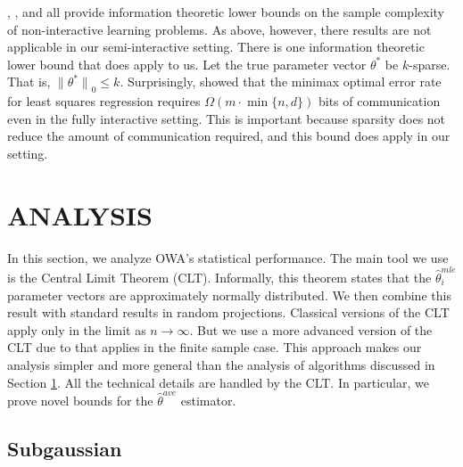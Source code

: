 \documentclass[twoside]{article}
\newcommand{\w}{\theta}
\newcommand{\wave}{\hat\w^{ave}}
\newcommand{\wmle}{\hat\w^{mle}}
\newcommand{\wstar}{{\w^{*}}}
\newcommand{\lzero}[1]{{\lVert {#1} \rVert}_0}
\begin{document}
\cite{shamir2014fundamental}, \cite{zhang2013information}, and \cite{garg2014communication} all provide information theoretic lower bounds on the sample complexity of non-interactive learning problems.
As above, however, there results are not applicable in our semi-interactive setting.
There is one information theoretic lower bound that does apply to us.
Let the true parameter vector $\wstar$ be $k$-sparse.
That is, $\lzero{\wstar} \le k$.
Surprisingly, \cite{braverman2015communication} showed that the minimax optimal error rate for least squares regression requires $\Omega(m\cdot\min\{n,d\})$ bits of communication even in the fully interactive setting.
This is important because sparsity does not reduce the amount of communication required, and this bound does apply in our setting.

\section{ANALYSIS}
\label{sec:anal}

In this section, we analyze OWA's statistical performance.
The main tool we use is the Central Limit Theorem (CLT).
Informally, this theorem states that the $\wmle_i$ parameter vectors are approximately normally distributed.
We then combine this result with standard results in random projections.
Classical versions of the CLT apply only in the limit as $n\to\infty$.
But we use a more advanced version of the CLT due to \cite{spokoiny2012parametricestimation} that applies in the finite sample case.
This approach makes our analysis simpler and more general than the analysis of algorithms discussed in Section \ref{sec:anal}.
All the technical details are handled by the CLT.
In particular, we prove novel bounds for the $\wave$ estimator.

\subsection {Subgaussian}
\end{document}
